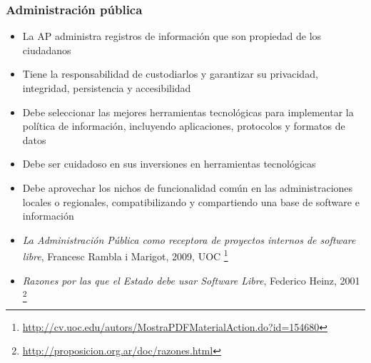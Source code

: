 \subsubsection {Administración pública}
\begin{itemize}
	\item La AP administra registros de información que son propiedad de los ciudadanos
	\item Tiene la responsabilidad de custodiarlos y garantizar su privacidad, integridad, persistencia y accesibilidad
	\item Debe seleccionar las mejores herramientas tecnológicas para implementar la política de información, incluyendo aplicaciones, protocolos y formatos de datos
	\item Debe ser cuidadoso en sus inversiones en herramientas tecnológicas
	\item Debe aprovechar los nichos de funcionalidad común en las administraciones locales o regionales, compatibilizando y compartiendo una base de software e información  
	\item \emph{La Administración Pública como receptora de proyectos internos de software libre}, Francesc Rambla i Marigot, 2009, UOC \footnote{\url{http://cv.uoc.edu/autors/MostraPDFMaterialAction.do?id=154680}}
	\item \emph{Razones por las que el Estado debe usar Software Libre}, Federico Heinz, 2001 \footnote{\url{http://proposicion.org.ar/doc/razones.html}}
\end{itemize}
 

